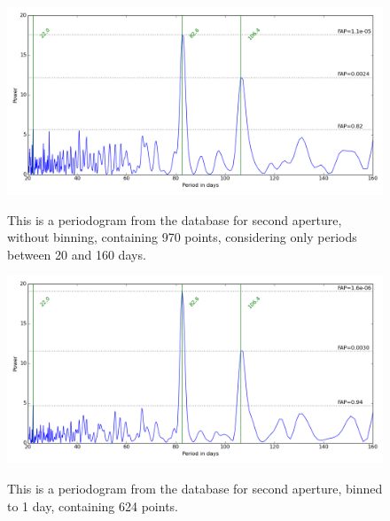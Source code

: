 \begin{figure}[!htbp]
\begin{center}
\includegraphics[scale=0.50]{Figures/asasnobin.png} \\
\end{center}
\caption{This is a periodogram from the {\asas} database for {\prox} second aperture, without binning, containing 970
  points, considering only periods between 20 and 160 days.}
\protect\label{fig:asaspgram1}
\end{figure}

\begin{figure}[!htbp]
\begin{center}
\includegraphics[scale=0.50]{Figures/asasbin1.png} \\
\end{center}
\caption{This is a periodogram from the {\asas} database for {\prox} second aperture, binned to 1 day, containing 624 points.}
\protect\label{fig:asaspgram2}
\end{figure}

